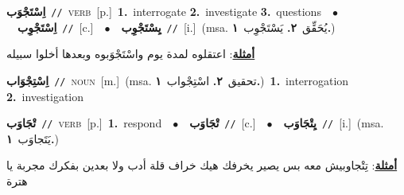 \documentclass[10pt,a4paper,twoside]{article} %
\begin{document}
\begin{multicols}{2}
{\setlength\topsep{0pt}\textbf{\foreignlanguage{arabic}{اِسْتَجْوَب}}\ {\color{gray}\texttt{//}\color{black}}\ \textsc{verb}\ [p.]\ \textbf{1.}~interrogate  \textbf{2.}~investigate  \textbf{3.}~questions\ \ $\bullet$\ \ \setlength\topsep{0pt}\textbf{\foreignlanguage{arabic}{اِسْتَجْوِب}}\ {\color{gray}\texttt{//}\color{black}}\ [c.]\ \ $\bullet$\ \ \setlength\topsep{0pt}\textbf{\foreignlanguage{arabic}{يِسْتَجْوِب}}\ {\color{gray}\texttt{//}\color{black}}\ [i.]\ \color{gray}(msa. \foreignlanguage{arabic}{يُحَقِّق}~\foreignlanguage{arabic}{\textbf{٢.}}  \foreignlanguage{arabic}{يَسْتَجْوِب}~\foreignlanguage{arabic}{\textbf{١.}})\color{black}\  \begin{flushright}\color{gray}\foreignlanguage{arabic}{\textbf{\underline{\foreignlanguage{arabic}{أمثلة}}}: اعتقلوه لمدة يوم واسْتَجْوَبوه وبعدها أخلوا سبيله}\end{flushright}\color{black}} \vspace{2mm}

{\setlength\topsep{0pt}\textbf{\foreignlanguage{arabic}{اِسْتِجْوَاب}}\ {\color{gray}\texttt{//}\color{black}}\ \textsc{noun}\ [m.]\ \color{gray}(msa. \foreignlanguage{arabic}{تحقيق}~\foreignlanguage{arabic}{\textbf{٢.}}  \foreignlanguage{arabic}{اسْتِجْواب}~\foreignlanguage{arabic}{\textbf{١.}})\color{black}\ \textbf{1.}~interrogation  \textbf{2.}~investigation\ } \vspace{2mm}

{\setlength\topsep{0pt}\textbf{\foreignlanguage{arabic}{تْجَاوَب}}\ {\color{gray}\texttt{//}\color{black}}\ \textsc{verb}\ [p.]\ \textbf{1.}~respond\ \ $\bullet$\ \ \setlength\topsep{0pt}\textbf{\foreignlanguage{arabic}{تْجَاوَب}}\ {\color{gray}\texttt{//}\color{black}}\ [c.]\ \ $\bullet$\ \ \setlength\topsep{0pt}\textbf{\foreignlanguage{arabic}{يِتْجَاوَب}}\ {\color{gray}\texttt{//}\color{black}}\ [i.]\ \color{gray}(msa. \foreignlanguage{arabic}{يَتَجاوَب}~\foreignlanguage{arabic}{\textbf{١.}})\color{black}\  \begin{flushright}\color{gray}\foreignlanguage{arabic}{\textbf{\underline{\foreignlanguage{arabic}{أمثلة}}}: تِتْجاوبيش معه بس يصير يخرفك هيك خراف قلة أدب ولا بعدين بفكرك مجربة يا هترة}\end{flushright}\color{black}} \vspace{2mm}


\end{multicols}
\end{document}
